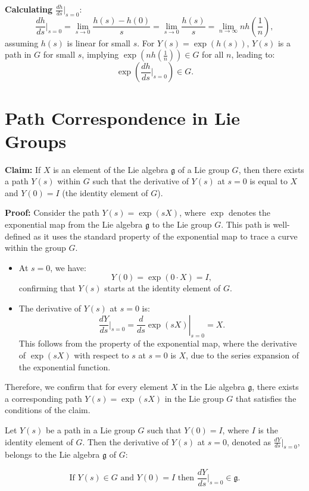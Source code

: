 \documentclass{article}
\begin{document}
\textbf{Calculating \( \frac{dh}{ds}\bigg|_{s=0} \)}:
\[
\frac{dh}{ds}\bigg|_{s=0} = \lim_{s \to 0} \frac{h(s) - h(0)}{s} = \lim_{s \to 0} \frac{h(s)}{s} = \lim_{n \to \infty} n h\left(\frac{1}{n}\right),
\]
assuming \( h(s) \) is linear for small \(s\). For \(Y(s) = \exp(h(s))\), \(Y(s)\) is a path in \(G\) for small \(s\), implying \( \exp(n h(\frac{1}{n})) \in G \) for all \(n\), leading to:
\[
\exp\left(\frac{dh}{ds}\bigg|_{s=0}\right) \in G.
\]

\section*{Path Correspondence in Lie Groups}

\textbf{Claim:} If \( X \) is an element of the Lie algebra \(\mathfrak{g}\) of a Lie group \(G\), then there exists a path \( Y(s) \) within \( G \) such that the derivative of \( Y(s) \) at \( s = 0 \) is equal to \( X \) and \( Y(0) = I \) (the identity element of \( G \)).

\textbf{Proof:}
Consider the path \( Y(s) = \exp(sX) \), where \( \exp \) denotes the exponential map from the Lie algebra \(\mathfrak{g}\) to the Lie group \(G\). This path is well-defined as it uses the standard property of the exponential map to trace a curve within the group \(G\).

\begin{itemize}
    \item At \( s = 0 \), we have:
    \[
    Y(0) = \exp(0 \cdot X) = I,
    \]
    confirming that \( Y(s) \) starts at the identity element of \( G \).

    \item The derivative of \( Y(s) \) at \( s = 0 \) is:
    \[
    \frac{dY}{ds}\bigg|_{s=0} = \left. \frac{d}{ds} \exp(sX) \right|_{s=0} = X.
    \]
    This follows from the property of the exponential map, where the derivative of \(\exp(sX)\) with respect to \(s\) at \(s = 0\) is \(X\), due to the series expansion of the exponential function.
\end{itemize}

Therefore, we confirm that for every element \( X \) in the Lie algebra \(\mathfrak{g}\), there exists a corresponding path \( Y(s) = \exp(sX) \) in the Lie group \( G \) that satisfies the conditions of the claim. 

\begin{theorem}
    
Let \( Y(s) \) be a path in a Lie group \( G \) such that \( Y(0) = I \), where \( I \) is the identity element of \( G \). Then the derivative of \( Y(s) \) at \( s = 0 \), denoted as \( \frac{dY}{ds}\bigg|_{s=0} \), belongs to the Lie algebra \(\mathfrak{g}\) of \( G \):

\[
\text{If } Y(s) \in G \text{ and } Y(0) = I \text{ then } \frac{dY}{ds}\bigg|_{s=0} \in \mathfrak{g}.
\]

\end{theorem}
\end{document}
